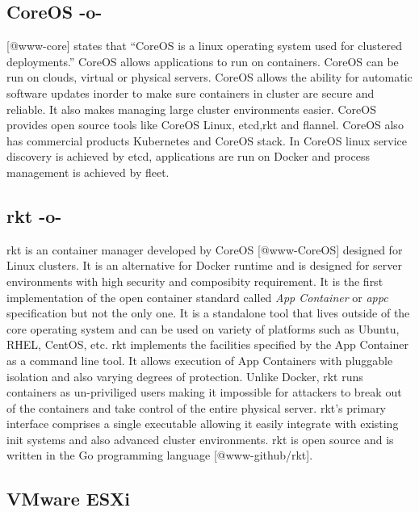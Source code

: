 \subsection{CoreOS -o-}
 [@www-core] states that ``CoreOS is a linux operating system used
for clustered deployments.'' CoreOS allows applications to run on
containers. CoreOS can be run on clouds, virtual or physical
servers. CoreOS allows the ability for automatic software updates
inorder to make sure containers in cluster are secure and reliable. It
also makes managing large cluster environments easier. CoreOS provides
open source tools like CoreOS Linux, etcd,rkt and flannel. CoreOS also
has commercial products Kubernetes and CoreOS stack. In CoreOS linux
service discovery is achieved by etcd, applications are run on Docker
and process management is achieved by fleet.

\subsection{rkt -o-}

rkt is an container manager developed by CoreOS [@www-CoreOS]
designed for Linux clusters. It is an alternative for Docker runtime
and is designed for server environments with high security and
composibity requirement. It is the first implementation of the open
container standard called \textit{App Container} or \textit{appc}
specification but not the only one.  It is a standalone tool that
lives outside of the core operating system and can be used on variety
of platforms such as Ubuntu, RHEL, CentOS, etc. rkt implements the
facilities specified by the App Container as a command line tool. It
allows execution of App Containers with pluggable isolation and also
varying degrees of protection. Unlike Docker, rkt runs containers as
un-priviliged users making it impossible for attackers to break out of
the containers and take control of the entire physical server. rkt's
primary interface comprises a single executable allowing it easily
integrate with existing init systems and also advanced cluster
environments. rkt is open source and is written in the Go programming
language [@www-github/rkt].

     
\subsection{VMware ESXi}


